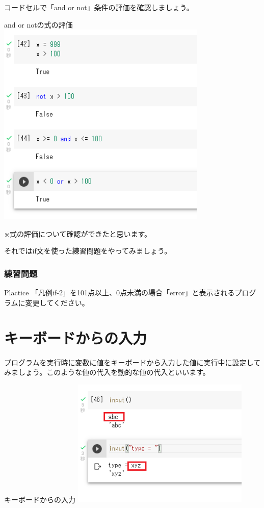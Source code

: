 \documentclass[11pt,a4paper,dvipdfmx,titlepage]{jsreport}
\begin{document}
 {\gt コードセル}で「and or not」条件の評価を確認しましょう。

\begin{grabox}{and or notの式の評価}
\includegraphics[width=10cm]{images/colab17.png}
\end{grabox}
※式の評価について確認ができたと思います。


それではif文を使った練習問題をやってみましょう。

\subsubsection{練習問題}
\begin{plabox}{Plactice}
「凡例if-2」を101点以上、0点未満の場合「error」と表示されるプログラムに変更してください。


\end{plabox}

\section{キーボードからの入力}
プログラムを実行時に変数に値をキーボードから入力した値に実行中に設定してみましょう。このような値の代入を動的な値の代入といいます。

\begin{grabox}{キーボードからの入力}
\includegraphics[width=8.5cm]{images/colab18.png}
\end{grabox}
\end{document}
